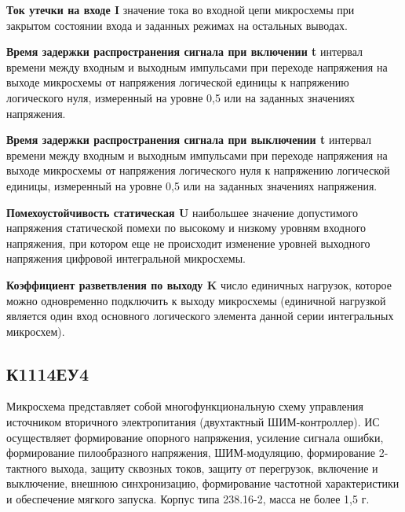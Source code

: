 \textbf{Ток утечки на входе I} \longndash значение тока во входной цепи микросхемы при закрытом состоянии входа и заданных режимах на остальных выводах.
 
\textbf{Время задержки распространения сигнала при включении t} \longndash интервал времени между входным и выходным импульсами при переходе напряжения на выходе микросхемы от напряжения логической единицы к напряжению логического нуля, измеренный на уровне 0,5 или на заданных значениях напряжения.

\textbf{Время задержки распространения сигнала при выключении  t} \longndash интервал времени между входным и выходным импульсами при переходе напряжения на выходе микросхемы от напряжения логического нуля к напряжению логической единицы, измеренный на уровне 0,5 или на заданных значениях напряжения. 

\textbf{Помехоустойчивость статическая U} \longndash наибольшее значение допустимого напряжения статической помехи по высокому и низкому уровням входного напряжения, при котором еще не происходит изменение уровней выходного напряжения цифровой интегральной микросхемы. 

\textbf{Коэффициент разветвления по выходу K} \longndash число единичных нагрузок, которое можно одновременно подключить к выходу микросхемы (единичной нагрузкой является один вход основного логического элемента данной серии интегральных микросхем).

\subsection*{К1114ЕУ4}

Микросхема представляет собой многофункциональную схему управления источником вторичного электропитания (двухтактный ШИМ-контроллер). ИС осуществляет формирование опорного напряжения, усиление сигнала ошибки, формирование пилообразного напряжения, ШИМ-модуляцию, формирование 2-тактного выхода, защиту сквозных токов, защиту от перегрузок, включение и выключение, внешнюю синхронизацию, формирование частотной характеристики и обеспечение мягкого запуска. Корпус типа 238.16-2, масса не более 1,5 г.

